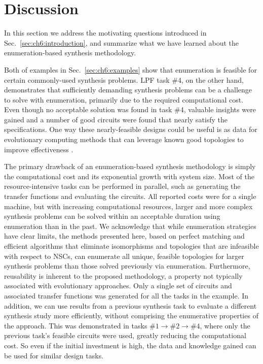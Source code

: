 \section{Discussion\label{sec:ch6:discussion}}

In this section we address the motivating questions introduced in Sec.~\ref{sec:ch6:introduction}, and summarize what we have learned about the enumeration-based synthesis methodology.

Both of examples in Sec.~\ref{sec:ch6:examples} show that enumeration is feasible for certain commonly-used synthesis problems.
LPF task \#4, on the other hand, demonstrates that sufficiently demanding synthesis problems can be a challenge to solve with enumeration, primarily due to the required computational cost.
Even though no acceptable solution was found in task \#4, valuable insights were gained and a number of good circuits were found that nearly satisfy the specifications.
One way these nearly-feasible designs could be useful is as data for evolutionary computing methods that can leverage known good topologies to improve effectiveness \cite{Goh2001a}.

The primary drawback of an enumeration-based synthesis methodology is simply the computational cost and its exponential growth with system size.
Most of the resource-intensive tasks can be performed in parallel, such as generating the transfer functions and evaluating the circuits.
All reported costs were for a single machine, but with increasing computational resources, larger and more complex synthesis problems can be solved within an acceptable duration using enumeration than in the past. 
We acknowledge that while enumeration strategies have clear limits, the methods presented here, based on perfect matching and efficient algorithms that eliminate isomorphisms and topologies that are infeasible with respect to NSCs, can enumerate all unique, feasible topologies for larger synthesis problems than those solved previously via enumeration. 
Furthermore, reusability is inherent to the proposed methodology, a property not typically associated with evolutionary approaches.
Only a single set of circuits and associated transfer functions was generated for all the tasks in the  example.
In addition, we can use results from a previous synthesis task to evaluate a different synthesis study more efficiently, without comprising the enumerative properties of the approach. 
This was demonstrated in tasks $\#1\to\#2\to\#4$, where only the previous task's feasible circuits were used, greatly reducing the computational cost.
So even if the initial investment is high, the data and knowledge gained can be used for similar design tasks.

